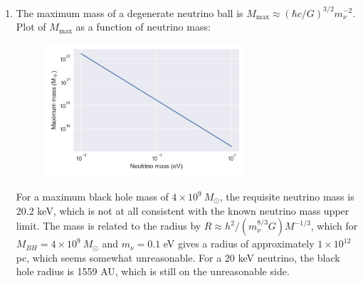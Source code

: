 \documentclass[11pt]{article}
\begin{document}
\begin{enumerate}
\item The maximum mass of a degenerate neutrino ball is $M_\mathrm{max} \approx (\hbar c / G)^{3/2} m_\nu^{-2}$. Plot of $M_\mathrm{max}$ as a function of neutrino mass:
    \begin{figure}[H]
    \centering
    \includegraphics[width=0.7\textwidth]{neutrino.jpg}
    \end{figure}
    For a maximum black hole mass of $4 \times 10^9~M_\odot$, the requisite neutrino mass is 
20.2 keV, which is not at all consistent with the known neutrino mass upper limit. The mass is related to the radius by $R \approx h^2/(m_\nu^{8/3}G) M^{-1/3}$, which for $M_{BH} = 4 \times 10^9~M_\odot$ and $m_\nu = 0.1$ eV gives a radius of approximately $1\times10^{12}$ pc, which seems somewhat unreasonable. For a 20 keV neutrino, the black hole radius is 1559 AU, which is still on the unreasonable side.

\end{enumerate}
\end{document}
